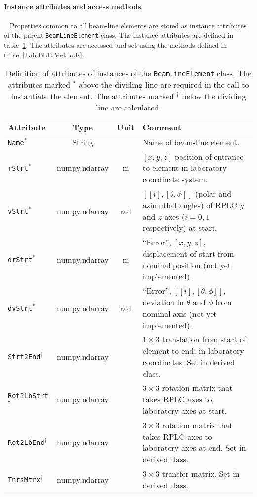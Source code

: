 \paragraph{Instance attributes and access methods} ~\newline
\label{SubSubSect:BLE:InstAttr}
\noindent
Properties common to all beam-line elements are stored as instance
attributes of the parent \texttt{BeamLineElement} class.
The instance attributes are defined in table~\ref{Tab:BLE:Attributes}.
The attributes are accessed and set using the methods defined in
table~\ref{Tab:BLE:Methods}.
\begin{table}[h]
  \caption{
    Definition of attributes of instances of
    the \texttt{BeamLineElement} class.
    The attributes marked $^*$ above the dividing line are required in
    the call to instantiate the element.
    The attributes marked $^\dagger$ below the dividing line are
    calculated.
  }
  \label{Tab:BLE:Attributes}
  \begin{center}
    \begin{tabular}{|l|c|c|p{10cm}|}
      \hline
      \textbf{Attribute} & \textbf{Type} & \textbf{Unit} & \textbf{Comment}                                                                   \\
      \hline
      \texttt{Name}$^*$     & String        &     & Name of beam-line element.                                                                \\
      \texttt{rStrt}$^*$    & numpy.ndarray & m   & $[x, y, z]$ position of entrance to element in laboratory coordinate system.              \\
      \texttt{vStrt}$^*$    & numpy.ndarray & rad & $[[i],[\theta, \phi]]$ (polar and azimuthal angles) of RPLC $y$ and $z$ axes ($i=0,1$ respectively) at start. \\
      \texttt{drStrt}$^*$   & numpy.ndarray & m   & ``Error'', $[x, y, z]$, displacement of start from nominal position (not yet implemented).\\
      \texttt{dvStrt}$^*$   & numpy.ndarray & rad & ``Error'', $[[i],[\theta, \phi]]$, deviation in $\theta$ and $\phi$ from nominal axis (not yet implemented). \\
      \hline
      \texttt{Strt2End}$^\dagger$     & numpy.ndarray &     & $1\times3$ translation from start of element to end; in laboratory coordinates.  Set in derived class. \\
      \texttt{Rot2LbStrt}$^\dagger$   & numpy.ndarray &     & $3\times3$ rotation matrix that takes RPLC axes to laboratory axes at start.     \\
      \texttt{Rot2LbEnd}$^\dagger$    & numpy.ndarray &     & $3\times3$ rotation matrix that takes RPLC axes to laboratory axes at end.  Set in derived class.      \\
      \texttt{TnrsMtrx}$^\dagger$     & numpy.ndarray &     & $3\times3$ transfer matrix.  Set in derived class.                               \\
      \hline
    \end{tabular}
  \end{center}
\end{table}
